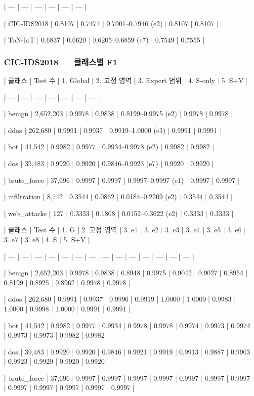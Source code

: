 | --- | --- | --- | --- | --- | --- |

| CIC-IDS2018 | 0.8107 | 0.7477 | 0.7001–0.7946 (e2) | 0.8107 | 0.8107 |

| ToN-IoT | 0.6837 | 0.6620 | 0.6205–0.6859 (e7) | 0.7549 | 0.7555 |

\subsubsection{CIC-IDS2018 — 클래스별 F1}
| 클래스 | Test 수 | 1. Global | 2. 고정 영역 | 3. Expert 범위 | 4. S-only | 5. S+\allowbreak{}V |

| --- | --- | --- | --- | --- | --- | --- |

| benign | 2,652,203 | 0.9978 | 0.9838 | 0.8199–0.9975 (e2) | 0.9978 | 0.9978 |

| ddos | 262,680 | 0.9991 | 0.9937 | 0.9919–1.0000 (e3) | 0.9991 | 0.9991 |

| bot | 41,542 | 0.9982 | 0.9977 | 0.9934–0.9978 (e2) | 0.9982 | 0.9982 |

| dos | 39,483 | 0.9920 | 0.9920 | 0.9846–0.9923 (e7) | 0.9920 | 0.9920 |

| brute\_\allowbreak{}force | 37,696 | 0.9997 | 0.9997 | 0.9997–0.9997 (e1) | 0.9997 | 0.9997 |

| infiltration | 8,742 | 0.3544 | 0.0862 | 0.0184–0.2209 (e2) | 0.3544 | 0.3544 |

| web\_\allowbreak{}attacks | 127 | 0.3333 | 0.1808 | 0.0152–0.3622 (e2) | 0.3333 | 0.3333 |

| 클래스 | Test 수 | 1. G | 2. 고정 영역 | 3. e1 | 3. e2 | 3. e3 | 3. e4 | 3. e5 | 3. e6 | 3. e7 | 3. e8 | 4. S | 5. S+\allowbreak{}V |

| --- | --- | --- | --- | --- | --- | --- | --- | --- | --- | --- | --- | --- | --- |

| benign | 2,652,203 | 0.9978 | 0.9838 | 0.8948 | 0.9975 | 0.9042 | 0.9027 | 0.8954 | 0.8199 | 0.8925 | 0.8962 | 0.9978 | 0.9978 |

| ddos | 262,680 | 0.9991 | 0.9937 | 0.9996 | 0.9919 | 1.0000 | 1.0000 | 0.9983 | 1.0000 | 0.9998 | 1.0000 | 0.9991 | 0.9991 |

| bot | 41,542 | 0.9982 | 0.9977 | 0.9934 | 0.9978 | 0.9978 | 0.9974 | 0.9973 | 0.9974 | 0.9973 | 0.9973 | 0.9982 | 0.9982 |

| dos | 39,483 | 0.9920 | 0.9920 | 0.9846 | 0.9921 | 0.9919 | 0.9913 | 0.9887 | 0.9903 | 0.9923 | 0.9920 | 0.9920 | 0.9920 |

| brute\_\allowbreak{}force | 37,696 | 0.9997 | 0.9997 | 0.9997 | 0.9997 | 0.9997 | 0.9997 | 0.9997 | 0.9997 | 0.9997 | 0.9997 | 0.9997 | 0.9997 |

